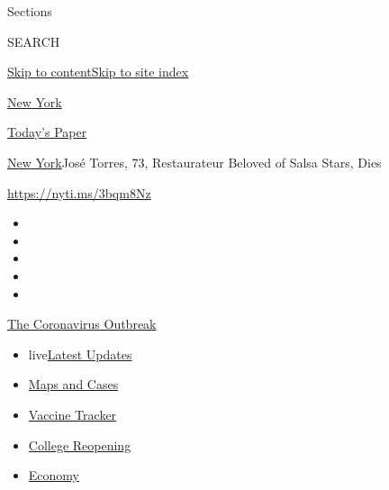 Sections

SEARCH

\protect\hyperlink{site-content}{Skip to
content}\protect\hyperlink{site-index}{Skip to site index}

\href{https://www.nytimes.com/section/nyregion}{New York}

\href{https://myaccount.nytimes.com/auth/login?response_type=cookie\&client_id=vi}{}

\href{https://www.nytimes.com/section/todayspaper}{Today's Paper}

\href{/section/nyregion}{New York}\textbar{}José Torres, 73,
Restaurateur Beloved of Salsa Stars, Dies

\url{https://nyti.ms/3bqm8Nz}

\begin{itemize}
\item
\item
\item
\item
\item
\end{itemize}

\href{https://www.nytimes.com/news-event/coronavirus?action=click\&pgtype=Article\&state=default\&region=TOP_BANNER\&context=storylines_menu}{The
Coronavirus Outbreak}

\begin{itemize}
\tightlist
\item
  live\href{https://www.nytimes.com/2020/08/03/world/coronavirus-covid-19.html?action=click\&pgtype=Article\&state=default\&region=TOP_BANNER\&context=storylines_menu}{Latest
  Updates}
\item
  \href{https://www.nytimes.com/interactive/2020/us/coronavirus-us-cases.html?action=click\&pgtype=Article\&state=default\&region=TOP_BANNER\&context=storylines_menu}{Maps
  and Cases}
\item
  \href{https://www.nytimes.com/interactive/2020/science/coronavirus-vaccine-tracker.html?action=click\&pgtype=Article\&state=default\&region=TOP_BANNER\&context=storylines_menu}{Vaccine
  Tracker}
\item
  \href{https://www.nytimes.com/2020/08/02/us/covid-college-reopening.html?action=click\&pgtype=Article\&state=default\&region=TOP_BANNER\&context=storylines_menu}{College
  Reopening}
\item
  \href{https://www.nytimes.com/live/2020/08/03/business/stock-market-today-coronavirus?action=click\&pgtype=Article\&state=default\&region=TOP_BANNER\&context=storylines_menu}{Economy}
\end{itemize}

